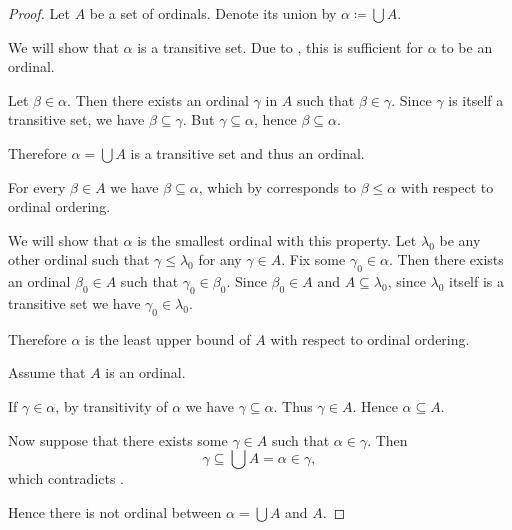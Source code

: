 \begin{proof}
   Let \( A \) be a set of ordinals. Denote its union by \( \alpha \coloneqq \bigcup A \).

  We will show that \( \alpha \) is a transitive set. Due to , this is sufficient for \( \alpha \) to be an ordinal.

  Let \( \beta \in \alpha \). Then there exists an ordinal \( \gamma \) in \( A \) such that \( \beta \in \gamma \). Since \( \gamma \) is itself a transitive set, we have \( \beta \subseteq \gamma \). But \( \gamma \subseteq \alpha \), hence \( \beta \subseteq \alpha \).

  Therefore \( \alpha = \bigcup A \) is a transitive set and thus an ordinal.

   For every \( \beta \in A \) we have \( \beta \subseteq \alpha \), which by  corresponds to \( \beta \leq \alpha \) with respect to ordinal ordering.

  We will show that \( \alpha \) is the smallest ordinal with this property. Let \( \lambda_0 \) be any other ordinal such that \( \gamma \leq \lambda_0 \) for any \( \gamma \in A \). Fix some \( \gamma_0 \in \alpha \). Then there exists an ordinal \( \beta_0 \in A \) such that \( \gamma_0 \in \beta_0 \). Since \( \beta_0 \in A \) and \( A \subseteq \lambda_0 \), since \( \lambda_0 \) itself is a transitive set we have \( \gamma_0 \in \lambda_0 \).

  Therefore \( \alpha \) is the least upper bound of \( A \) with respect to ordinal ordering.

   Assume that \( A \) is an ordinal.

  If \( \gamma \in \alpha \), by transitivity of \( \alpha \) we have \( \gamma \subseteq \alpha \). Thus \( \gamma \in A \). Hence \( \alpha \subseteq A \).

  Now suppose that there exists some \( \gamma \in A \) such that \( \alpha \in \gamma \). Then
  \begin{equation*}
    \gamma \subseteq \bigcup A = \alpha \in \gamma,
  \end{equation*}
  which contradicts .

  Hence there is not ordinal between \( \alpha = \bigcup A \) and \( A \).
\end{proof}

